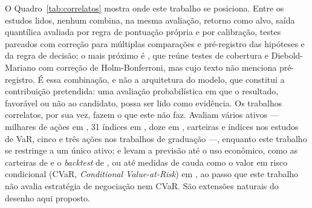 O Quadro~\ref{tab:correlatos} mostra onde este trabalho se posiciona. Entre os estudos lidos, nenhum combina, na mesma avaliação, retorno como alvo, saída quantílica avaliada por regra de pontuação própria e por calibração, testes pareados com correção para múltiplas comparações e pré-registro das hipóteses e da regra de decisão; o mais próximo é , que reúne testes de cobertura e Diebold-Mariano com correção de Holm-Bonferroni, mas cujo texto não menciona pré-registro. É essa combinação, e não a arquitetura do modelo, que constitui a contribuição pretendida: uma avaliação probabilística em que o resultado, favorável ou não ao candidato, possa ser lido como evidência. Os trabalhos correlatos, por sua vez, fazem o que este não faz. Avaliam vários ativos --- milhares de ações em , 31 índices em , doze em , carteiras e índices nos estudos de VaR, cinco e três ações nos trabalhos de graduação ---, enquanto este trabalho se restringe a um único ativo; e levam a previsão até o uso econômico, como as carteiras de  e o \textit{backtest} de , ou até medidas de cauda como o valor em risco condicional (CVaR, \textit{Conditional Value-at-Risk}) em , ao passo que este trabalho não avalia estratégia de negociação nem CVaR. São extensões naturais do desenho aqui proposto.
